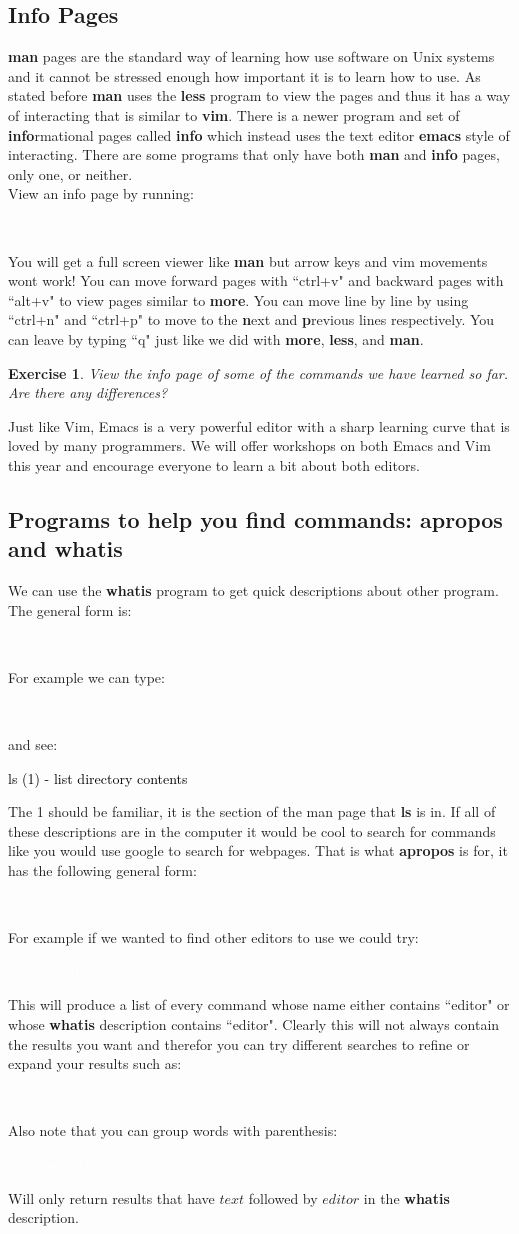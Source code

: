 \documentclass{book}
\newcommand{\commandline}[1]{\begin{center} \colorbox{Dark}{\textcolor{white}{#1}} \end{center}}
\newcommand{\exampleout}[1]{\begin{center} \colorbox{Light}{\textcolor{black}{#1}} \end{center}}
\newtheorem{ex}{Exercise}[chapter]
\begin{document}
\subsection{Info Pages}
\textbf{man} pages are the standard way of learning how use software on Unix systems and it cannot be stressed enough how important it is to learn how to use. As stated before \textbf{man} uses the \textbf{less} program to view the pages and thus it has a way of interacting that is similar to \textbf{vim}. There is a newer program and set of \textbf{info}rmational pages called \textbf{info} which instead uses the text editor \textbf{emacs} style of interacting. There are some programs that only have both \textbf{man} and \textbf{info} pages, only one, or neither. \\
View an info page by running:
\commandline{info programname}
You will get a full screen viewer like \textbf{man} but arrow keys and vim movements wont work! You can move forward pages with ``ctrl+v" and backward pages with ``alt+v" to view pages similar to \textbf{more}. You can move line by line by using ``ctrl+n" and ``ctrl+p" to move to the \textbf{n}ext and \textbf{p}revious lines respectively. You can leave by typing ``q" just like we did with \textbf{more}, \textbf{less}, and \textbf{man}. \\
\begin{ex}
	View the info page of some of the commands we have learned so far. Are there any differences? 
\end{ex}
Just like Vim, Emacs is a very powerful editor with a sharp learning curve that is loved by many programmers. We will offer workshops on both Emacs and Vim this year and encourage everyone to learn a bit about both editors. 

\subsection{Programs to help you find commands: \textbf{apropos} and \textbf{whatis}}
We can use the \textbf{whatis} program to get quick descriptions about other program. The general form is:
\commandline{whatis programname}
For example we can type:
\commandline{whatis ls}
and see:
\exampleout{ls (1)		- list directory contents}
The 1 should be familiar, it is the section of the man page that \textbf{ls} is in. If all of these descriptions are in the computer it would be cool to search for commands like you would use google to search for webpages.
That is what \textbf{apropos} is for, it has the following general form:
\commandline{apropos whatToSearchFor}
For example if we wanted to find other editors to use we could try:
\commandline{apropos editor}
This will produce a list of every command whose name either contains ``editor" or whose \textbf{whatis} description contains ``editor". Clearly this will not always contain the results you want and therefor you can try different searches to refine or expand your results such as:
\commandline{apropos text editor}
Also note that you can group words with parenthesis:
\commandline{apropos "text editor"} 
Will only return results that have $text$ followed by $editor$ in the \textbf{whatis} description.
\end{document}
